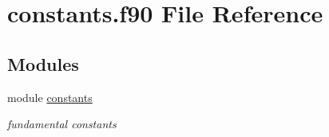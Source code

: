 \hypertarget{constants_8f90}{}\section{constants.\+f90 File Reference}
\label{constants_8f90}
\subsection*{Modules}
\begin{DoxyCompactItemize}
\item 
module \hyperlink{namespaceconstants}{constants}
\begin{DoxyCompactList}\small\item\em fundamental constants \end{DoxyCompactList}\end{DoxyCompactItemize}
